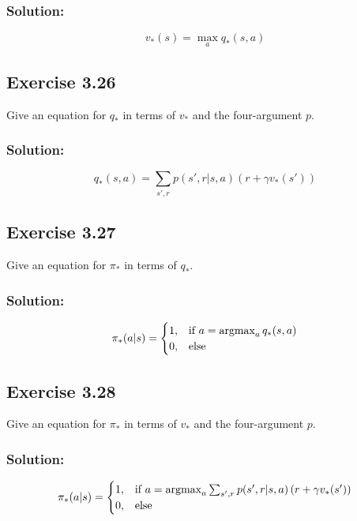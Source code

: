 \subsubsection*{Solution:}

\[
v_*(s) = \max_a q_*(s,a)
\]

\subsection*{Exercise 3.26}
Give an equation for $q_*$ in terms of $v_*$ and the four-argument $p$.

\subsubsection*{Solution:}

\[
q_*(s,a) = \sum_{s', r} p(s', r |s, a)  \left( r + \gamma v_*(s') \right)
\]

\subsection*{Exercise 3.27}
Give an equation for $\pi_*$ in terms of $q_*$.

\subsubsection*{Solution:}

\[
\pi_*(a|s) =
    \begin{cases}
        1,  & \text{if } a = \operatorname*{argmax}_a q_*(s,a)\\
        0,  & \text{else}
    \end{cases}
\]


\subsection*{Exercise 3.28}
Give an equation for $\pi_*$ in terms of $v_*$ and the four-argument $p$.

\subsubsection*{Solution:}

\[
\pi_*(a|s) =
    \begin{cases}
        1,  & \text{if } a = \operatorname*{argmax}_a \sum_{s', r} p(s', r |s, a)  \left( r + \gamma v_*(s') \right)\\
        0,  & \text{else}
    \end{cases}
\]

